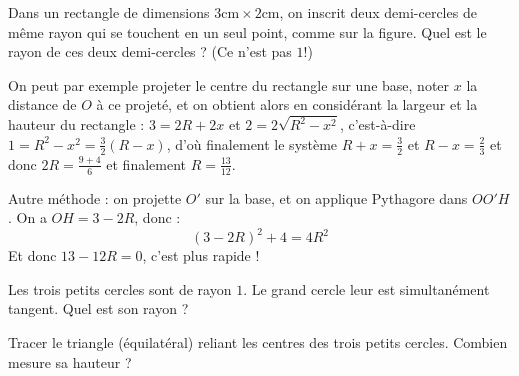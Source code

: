 
\begin{exo}
Dans un rectangle de dimensions $3\mathrm{cm}\times 2\mathrm{cm}$, on inscrit deux demi-cercles de même rayon qui se touchent en un seul point, comme sur la figure.
Quel est le rayon de ces deux demi-cercles ? (Ce n'est pas $1$!)
\begin{center}
\end{center}
\begin{sol}
On peut par exemple projeter le centre du rectangle sur une base, noter $x$ la distance de $O$ à ce projeté, et on obtient alors en considérant la largeur et la hauteur du rectangle :  $3=2R+2x$ et $2=2\sqrt{R^2-x^2}$, c'est-à-dire $1=R^2-x^2=\frac32(R-x)$, d'où finalement le système $R+x=\frac32$ et $R-x=\frac23$ et donc $2R=\frac{9+4}{6}$ et finalement $R=\frac{13}{12}$.

Autre méthode : on projette $O'$ sur la base, et on applique Pythagore dans $OO'H$. On a $OH=3-2R$, donc :
\[ (3-2R)^2+4=4R^2\]
Et donc $13-12R=0$, c'est plus rapide !
\end{sol}
\end{exo}





\begin{exo}
Les trois petits  cercles sont de rayon $1$.
Le grand cercle leur est simultanément tangent. Quel est son rayon ?
\begin{center}
\end{center}
\begin{hint}
Tracer le triangle (équilatéral) reliant les centres des trois petits cercles. Combien mesure  sa hauteur ?
\end{hint}
\end{exo}




